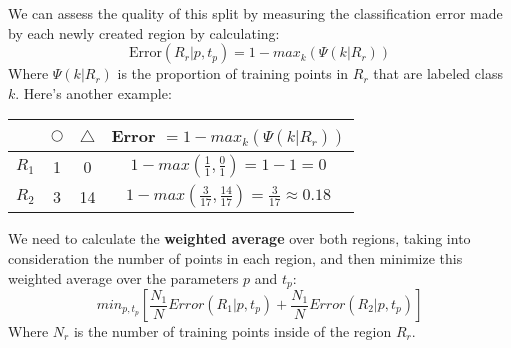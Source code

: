 \documentclass[11pt,a4paper]{report}
\begin{document}
We can assess the quality of this split by measuring the classification error made by each newly created region by calculating:
$$\textrm{Error}(R_r|p,t_p)= 1 - max_k(\Psi(k|R_r))$$
Where $\Psi(k|R_r)$ is the proportion of training points in $R_r$ that are labeled class $k$. Here's another example:\\
\begin{center}
\begin{tabular}{ |c|c|c|c| } 
 \hline
  & $\bigcirc$ & $\triangle$ & Error $= 1-max_k(\Psi(k|R_r))$\\\hline\hline
 $R_1$ & 1 & 0 & $1 - max(\frac{1}{1}, \frac{0}{1})= 1-1=0$\\\hline
 $R_2$ & 3 & 14 & $1 - max(\frac{3}{17}, \frac{14}{17}) = \frac{3}{17} \approx 0.18$\\\hline
\end{tabular}
\end{center}
We need to calculate the \textbf{weighted average} over both regions, taking into consideration the number of points in each region, and then minimize this weighted average over the parameters $p$ and $t_p$:
$$min_{p,t_p}\left[\frac{N_1}{N}Error(R_1|p,t_p)+\frac{N_1}{N}Error(R_2|p,t_p)\right]$$
Where $N_r$ is the number of training points inside of the region $R_r$.
\end{document}
